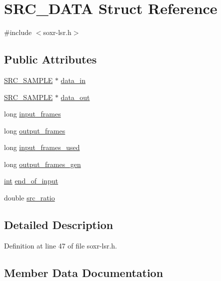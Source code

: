 \hypertarget{struct_s_r_c___d_a_t_a}{}\section{S\+R\+C\+\_\+\+D\+A\+TA Struct Reference}
\label{struct_s_r_c___d_a_t_a}


{\ttfamily \#include $<$soxr-\/lsr.\+h$>$}

\subsection*{Public Attributes}
\begin{DoxyCompactItemize}
\item 
\hyperlink{soxr-lsr_8h_aeed0ef55cbeaa78637727866e9ea4be8}{S\+R\+C\+\_\+\+S\+A\+M\+P\+LE} $\ast$ \hyperlink{struct_s_r_c___d_a_t_a_a000c251462ee769125402ccf83f448c2}{data\+\_\+in}
\item 
\hyperlink{soxr-lsr_8h_aeed0ef55cbeaa78637727866e9ea4be8}{S\+R\+C\+\_\+\+S\+A\+M\+P\+LE} $\ast$ \hyperlink{struct_s_r_c___d_a_t_a_a0796632ae8924241a07ccf26bd749ed4}{data\+\_\+out}
\item 
long \hyperlink{struct_s_r_c___d_a_t_a_a2b6fe0af73069250592190eece97a9ac}{input\+\_\+frames}
\item 
long \hyperlink{struct_s_r_c___d_a_t_a_abfaea2234191264ea58b4a19da4fe8c3}{output\+\_\+frames}
\item 
long \hyperlink{struct_s_r_c___d_a_t_a_accc338b0c6ec1074614dc4907fcc3bb1}{input\+\_\+frames\+\_\+used}
\item 
long \hyperlink{struct_s_r_c___d_a_t_a_a86f13e5d832a6f2bf2ec451097b2c7f2}{output\+\_\+frames\+\_\+gen}
\item 
\hyperlink{xmltok_8h_a5a0d4a5641ce434f1d23533f2b2e6653}{int} \hyperlink{struct_s_r_c___d_a_t_a_affc01ca4a99f3d15ab7c62da16b69eff}{end\+\_\+of\+\_\+input}
\item 
double \hyperlink{struct_s_r_c___d_a_t_a_acaeb0a1991debfd736b4004f0c459530}{src\+\_\+ratio}
\end{DoxyCompactItemize}


\subsection{Detailed Description}


Definition at line 47 of file soxr-\/lsr.\+h.



\subsection{Member Data Documentation}
